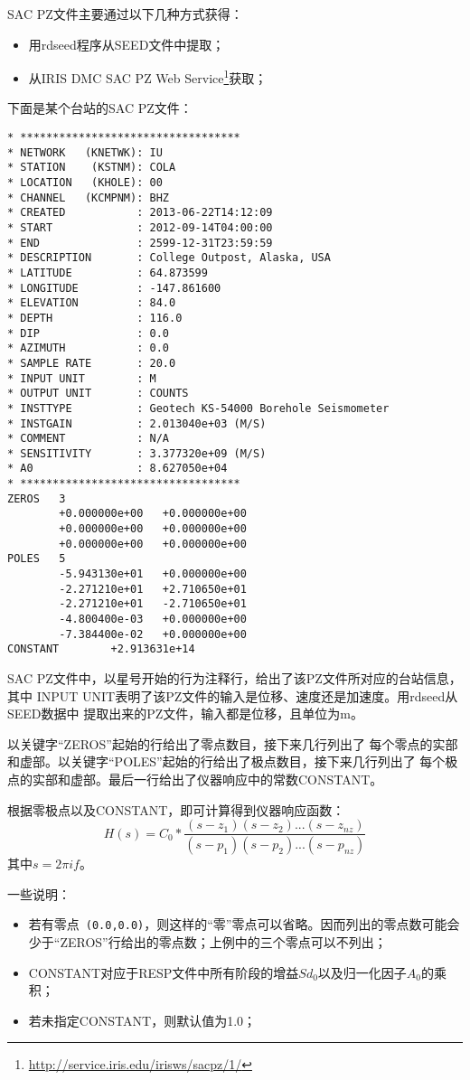 SAC PZ文件主要通过以下几种方式获得：
\begin{itemize}
\item 用rdseed程序从SEED文件中提取；
\item 从IRIS DMC SAC PZ Web Service\footnote{\url{http://service.iris.edu/irisws/sacpz/1/}}获取；
\end{itemize}

下面是某个台站的SAC PZ文件：
\begin{verbatim}
* **********************************
* NETWORK   (KNETWK): IU
* STATION    (KSTNM): COLA
* LOCATION   (KHOLE): 00
* CHANNEL   (KCMPNM): BHZ
* CREATED           : 2013-06-22T14:12:09
* START             : 2012-09-14T04:00:00
* END               : 2599-12-31T23:59:59
* DESCRIPTION       : College Outpost, Alaska, USA
* LATITUDE          : 64.873599
* LONGITUDE         : -147.861600
* ELEVATION         : 84.0
* DEPTH             : 116.0
* DIP               : 0.0
* AZIMUTH           : 0.0
* SAMPLE RATE       : 20.0
* INPUT UNIT        : M
* OUTPUT UNIT       : COUNTS
* INSTTYPE          : Geotech KS-54000 Borehole Seismometer
* INSTGAIN          : 2.013040e+03 (M/S)
* COMMENT           : N/A
* SENSITIVITY       : 3.377320e+09 (M/S)
* A0                : 8.627050e+04
* **********************************
ZEROS   3
        +0.000000e+00   +0.000000e+00
        +0.000000e+00   +0.000000e+00
        +0.000000e+00   +0.000000e+00
POLES   5
        -5.943130e+01   +0.000000e+00
        -2.271210e+01   +2.710650e+01
        -2.271210e+01   -2.710650e+01
        -4.800400e-03   +0.000000e+00
        -7.384400e-02   +0.000000e+00
CONSTANT        +2.913631e+14
\end{verbatim}

SAC PZ文件中，以星号开始的行为注释行，给出了该PZ文件所对应的台站信息，其中
INPUT UNIT表明了该PZ文件的输入是位移、速度还是加速度。用rdseed从SEED数据中
提取出来的PZ文件，输入都是位移，且单位为m。

以关键字``ZEROS''起始的行给出了零点数目，接下来几行列出了
每个零点的实部和虚部。以关键字``POLES''起始的行给出了极点数目，接下来几行列出了
每个极点的实部和虚部。最后一行给出了仪器响应中的常数CONSTANT。

根据零极点以及CONSTANT，即可计算得到仪器响应函数：
\[
    H(s) = C_0 * \frac{(s-z_1)(s-z_2)...(s-z_{nz})}{(s-p_1)(s-p_2)...(s-p_{nz})}
\]
其中$s=2\pi i f$。

一些说明：
\begin{itemize}
\item 若有零点~\verb+(0.0,0.0)+，则这样的``零''零点可以省略。因而列出的零点数可能会少于``ZEROS''行给出的零点数；上例中的三个零点可以不列出；
\item CONSTANT对应于RESP文件中所有阶段的增益$Sd_0$以及归一化因子$A_0$的乘积；
\item 若未指定CONSTANT，则默认值为1.0；
\end{itemize}

